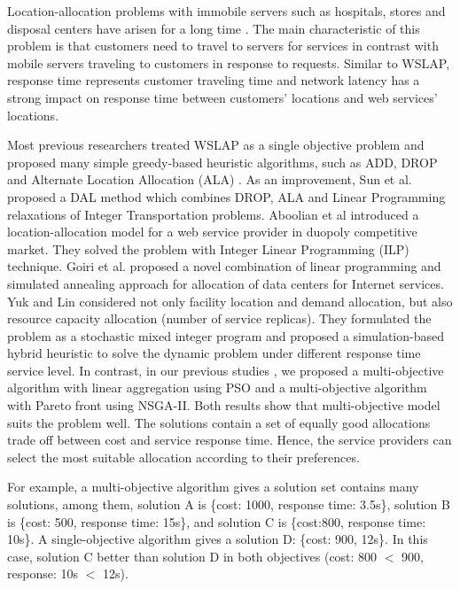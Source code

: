 \documentclass[10pt,journal,compsoc]{IEEEtran}
\begin{document}
Location-allocation problems with immobile servers such as hospitals, stores and disposal centers have arisen for a long time \cite{Vidyarthi201420}. The main characteristic of this problem is that customers need to travel to servers for services in contrast with mobile servers traveling to customers in response to requests. Similar to WSLAP, response time represents customer traveling time and network latency has a strong impact on response time between customers' locations and web services' locations. 



Most previous researchers treated WSLAP as a single objective problem and proposed many simple greedy-based heuristic algorithms, such as ADD, DROP and Alternate Location Allocation (ALA) \cite{Sun}.  As an improvement, Sun et al. \cite{Sun} proposed a DAL method which combines DROP, ALA and Linear Programming relaxations of Integer Transportation problems. Aboolian et al \cite{Aboolian} introduced a location-allocation model for a web service provider in duopoly competitive market. They solved the problem with Integer Linear Programming (ILP) technique. Goiri et al. \cite{5961695} proposed a novel combination of linear programming and simulated annealing approach for allocation of data centers for Internet services. 
Yuk and Lin \cite{lin2014solving} considered not only facility location and demand allocation, but also resource capacity allocation (number of service replicas). They formulated the problem as a stochastic mixed integer program and proposed a simulation-based hybrid heuristic to solve the dynamic problem under different response time service level.
In contrast, in our previous studies \cite{Tan2016a,Tan2016}, we proposed a multi-objective algorithm with linear aggregation using PSO and a multi-objective algorithm with Pareto front using NSGA-II. Both results show that 
multi-objective model suits the problem well. The solutions contain a set of equally good allocations trade off between cost and service response time. Hence, the service providers can select the most suitable allocation according to their preferences. 

For example, a multi-objective algorithm gives a solution set contains many solutions, among them, solution A is \{cost: 1000, response time: 3.5s\}, solution B is \{cost: 500, response time: 15s\}, and solution C is \{cost:800, response time: 10s\}. A single-objective algorithm gives a solution D: \{cost: 900, 12s\}. In this case, solution C better than solution D in both objectives (cost: 800 $<$ 900, response: 10s $<$ 12s).
\end{document}
